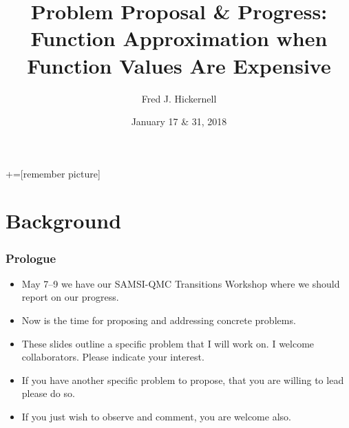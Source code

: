 \documentclass[11pt,compress,xcolor={usenames,dvipsnames},aspectratio=169]{beamer}
\title[]{Problem Proposal \& Progress:  \\
	Function Approximation when Function Values Are Expensive}
\author[]{Fred J. Hickernell}
\institute{Department of Applied Mathematics,  Illinois Institute of Technology \\
\href{mailto:hickernell@iit.edu}{\url{hickernell@iit.edu}} \quad
\href{http://mypages.iit.edu/~hickernell}{\url{mypages.iit.edu/~hickernell}}}
\date[]{January 17 \& 31, 2018}
\begin{document}
+=[remember picture]
\everymath{\displaystyle}

\frame{\titlepage}

\section{Background}

\begin{frame}
\frametitle{Prologue}
\begin{itemize}
	\item \alert{May 7--9} we have our SAMSI-QMC Transitions Workshop where we should report on our progress.
	
	\item Now is the time for proposing and addressing \alert{concrete problems}.
	
	\item These slides outline a specific problem that \alert{I will work on}.  I \alert{welcome} collaborators.  Please indicate your interest.
	
	\item If you have another specific problem to propose, that you are willing to lead \alert{please do so.}
	
	\item If you just wish to observe and comment, you are welcome also.
\end{itemize}
\end{frame}
\end{document}
